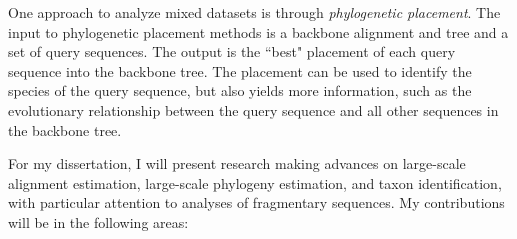 \documentclass[times, 10pt]{article}
\begin{document}
One approach to analyze mixed datasets is through \emph{phylogenetic placement}.  The input to phylogenetic placement methods is a backbone alignment and tree and a set of query sequences.  The output is the ``best" placement of each query sequence into the backbone tree.  The placement can be used to identify the species of the query sequence, but also yields more information, such as the evolutionary relationship between the query sequence and all other sequences in the backbone tree.%

For my dissertation, I will present research making advances on large-scale alignment estimation, large-scale phylogeny estimation, and taxon identification, with particular attention to analyses of fragmentary sequences.
My contributions will be in the following areas:
\end{document}
